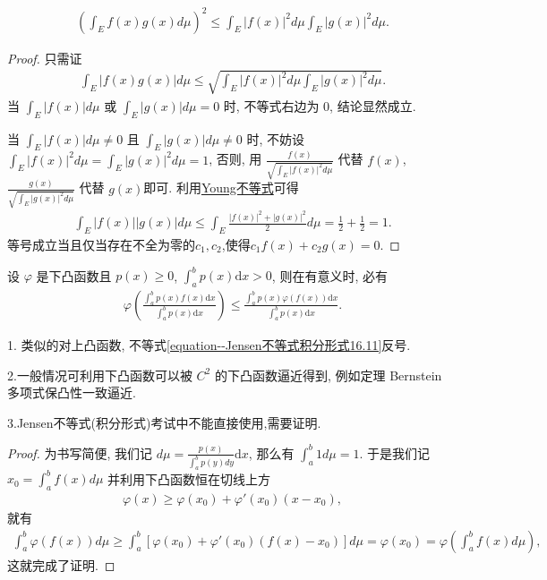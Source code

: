 \documentclass[../../main.tex]{subfiles}
\begin{document}
\begin{theorem}[Cauchy不等式]\label{theorem:Cauchy不等式(一般版本)}
\begin{align*}
\left(\int_E f(x)g(x) d\mu\right)^2 \leqslant \int_E |f(x)|^2 d\mu \int_E |g(x)|^2 d\mu.
\end{align*} 
\end{theorem}
\begin{proof}
只需证
\begin{align*}
\int_E |f(x)g(x)| d\mu \leqslant \sqrt{\int_E |f(x)|^2 d\mu \int_E |g(x)|^2 d\mu}.
\end{align*}
当 $\int_E |f(x)| d\mu$ 或 $\int_E |g(x)| d\mu = 0$ 时, 不等式右边为 $0$, 结论显然成立.

当 $\int_E |f(x)| d\mu \ne 0$ 且 $\int_E |g(x)| d\mu \ne 0$ 时, 不妨设 $\int_E |f(x)|^2 d\mu = \int_E |g(x)|^2 d\mu = 1$, 否则, 用 $\frac{f(x)}{\sqrt{\int_E |f(x)|^2 d\mu}}$ 代替 $f(x)$, $\frac{g(x)}{\sqrt{\int_E |g(x)|^2 d\mu}}$ 代替 $g(x)$即可.
利用\hyperref[theorem:Young不等式初等形式]{Young不等式}可得
\begin{align*}
\int_E |f(x)||g(x)| d\mu \leqslant \int_E \frac{|f(x)|^2 + |g(x)|^2}{2} d\mu = \frac{1}{2} + \frac{1}{2} = 1.
\end{align*}
等号成立当且仅当存在不全为零的$c_1,c_2$,使得$c_1f(x)+c_2g(x)=0.$
\end{proof}

\begin{theorem}\label{theorem:Jensen不等式积分形式}
设 $\varphi$ 是下凸函数且 $p(x) \geqslant 0$, $\int_a^b p(x) \mathrm{d}x > 0$, 则在有意义时, 必有
\begin{align}\label{equation--Jensen不等式积分形式16.11}
\varphi\left(\frac{\int_a^b p(x)f(x)\mathrm{d}x}{\int_a^b p(x)\mathrm{d}x}\right) \leqslant \frac{\int_a^b p(x)\varphi(f(x))\mathrm{d}x}{\int_a^b p(x)\mathrm{d}x}.
\end{align}
\end{theorem}
\begin{note}
1. 类似的对上凸函数, 不等式\eqref{equation--Jensen不等式积分形式16.11}反号.

2.一般情况可利用下凸函数可以被 $C^2$ 的下凸函数逼近得到, 例如定理 Bernstein 多项式保凸性一致逼近. 

3.Jensen不等式(积分形式)考试中不能直接使用,需要证明.
\end{note}
\begin{proof}
为书写简便, 我们记 $d\mu = \frac{p(x)}{\int_a^b p(y)dy}\mathrm{d}x$, 那么有 $\int_a^b 1d\mu = 1$. 于是我们记 $x_0 = \int_a^b f(x)d\mu$ 并利用下凸函数恒在切线上方
\begin{align*}
\varphi(x) \geqslant \varphi(x_0) + \varphi'(x_0)(x - x_0),
\end{align*}
就有
\begin{align*}
\int_a^b \varphi(f(x))d\mu \geqslant \int_a^b [\varphi(x_0) + \varphi'(x_0)(f(x) - x_0)]d\mu = \varphi(x_0) = \varphi\left(\int_a^b f(x)d\mu\right),
\end{align*}
这就完成了证明. 
\end{proof}
\end{document}
